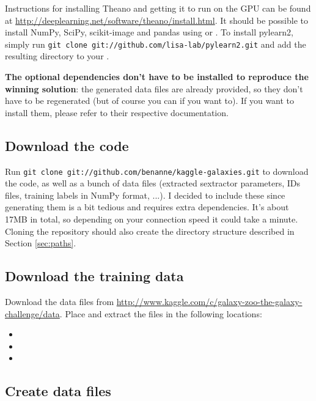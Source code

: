 \documentclass[a4paper,10pt]{article}
\begin{document}
Instructions for installing Theano and getting it to run on the GPU can be found at \url{http://deeplearning.net/software/theano/install.html}. It should be possible to install NumPy, SciPy, scikit-image and pandas using  or . To install pylearn2, simply run \texttt{git clone git://github.com/lisa-lab/pylearn2.git} and add the resulting directory to your .

\textbf{The optional dependencies don't have to be installed to reproduce the winning solution}: the generated data files are already provided, so they don't have to be regenerated (but of course you can if you want to). If you want to install them, please refer to their respective documentation.

\subsection{Download the code}

Run \texttt{git clone git://github.com/benanne/kaggle-galaxies.git} to download the code, as well as a bunch of data files (extracted sextractor parameters, IDs files, training labels in NumPy format, ...). I decided to include these since generating them is a bit tedious and requires extra dependencies. It's about 17MB in total, so depending on your connection speed it could take a minute. Cloning the repository should also create the directory structure described in Section \ref{sec:paths}.

\subsection{Download the training data}

Download the data files from \url{http://www.kaggle.com/c/galaxy-zoo-the-galaxy-challenge/data}. Place and extract the files in the following locations:

\begin{itemize}
 \item {}
 \item {}
 \item {}
\end{itemize}

\subsection{Create data files}
\end{document}
